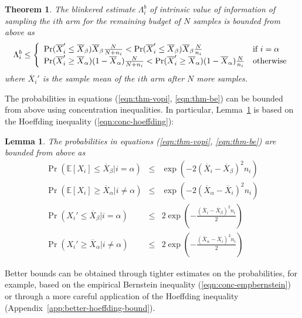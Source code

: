 \documentclass{article}
\newcommand {\IE} {\ensuremath {\mathbb{E}}}
\newtheorem{thm}{Theorem}
\newtheorem{lmm}{Lemma}
\begin{document}
\begin{thm} The blinkered estimate $\Lambda_i^b$ of intrinsic value of information of sampling
  the $i$th arm for the remaining budget of $N$ samples is bounded from above as
\begin{equation}
  \Lambda_i^b \le \left\{
  \begin{array}{l l}
    \Pr(\overline X_i'\le\overline X_\beta)\overline X_\beta\frac N {N+n_i} < \Pr(\overline X_i'\le\overline X_\beta)\overline X_\beta\frac N   {n_i} & \mbox{if $i=\alpha$} \\
    \Pr(\overline X_i'\ge\overline X_\alpha)(1-\overline X_\alpha)\frac N {N+n_i} < \Pr(\overline X_i'\ge\overline X_\alpha)(1-\overline X_\alpha)\frac N {n_i}&  \mbox{otherwise}
  \end{array} \right.
\label{eqn:thm-be}
\end{equation}
where $\overline X_i'$ is the sample mean of the $i$th arm after $N$ more
samples.
\end{thm}

 The probabilities in equations (\ref{eqn:thm-vopi}, \ref{eqn:thm-be}) can be bounded from above using concentration
inequalities. In particular, Lemma~\ref{lemma:hoeffding-prob-bounds} is
based on the Hoeffding inequality (\ref{eqn:conc-hoeffding}):
\begin{lmm} The probabilities in equations (\ref{eqn:thm-vopi}, \ref{eqn:thm-be}) are bounded from above as
\begin{eqnarray}
\Pr(\IE[X_i] \le \overline X_\beta|i=\alpha)& \le & \exp(-2 (\overline X_i - \overline X_\beta)^2 n_i)\nonumber\\
\Pr(\IE[X_i] \ge \overline X_\alpha|i\ne\alpha)& \le & \exp(-2 (\overline X_\alpha - \overline X_i)^2 n_i)\nonumber\\
\Pr(X_i' \le \overline X_\beta|i=\alpha)& \le & 2\exp\left(-\frac {(\overline X_i - \overline X_\beta)^2 n_i} 2 \right)\nonumber\\
\Pr(X_i' \ge \overline X_\alpha|i\ne\alpha)& \le & 2\exp\left(-\frac {(\overline X_\alpha - \overline X_i)^2 n_i} 2 \right)
\label{eqn:probound-perf-hoeffding}
\end{eqnarray}
\label{lemma:hoeffding-prob-bounds}
\end{lmm}

Better bounds can be obtained through tighter estimates on
the probabilities, for example, based on the empirical Bernstein
inequality (\ref{eqn:conc-empbernstein}) or through a more careful
application of the Hoeffding inequality (Appendix~\ref{app:better-hoeffding-bound}).
\end{document}
